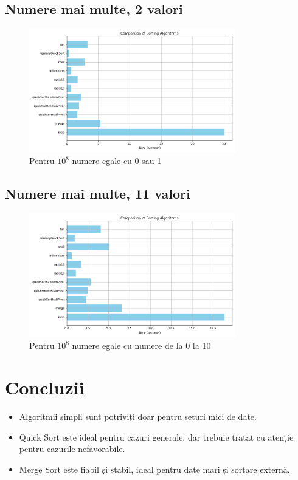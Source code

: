 \documentclass[12pt]{article}
\begin{document}
\subsection{Numere mai multe, 2 valori}
\begin{figure}[H]
    \centering
    \includegraphics[width=0.8\textwidth]{./img/img_20250417_023757.png} %
    \caption{Pentru $10^8$ numere egale cu 0 sau 1}
\end{figure}
\subsection{Numere mai multe, 11 valori}
\begin{figure}[H]
    \centering
    \includegraphics[width=0.8\textwidth]{./img/img_20250417_023946.png} %
    \caption{Pentru $10^8$ numere egale cu numere de la 0 la 10}
\end{figure}

\section{Concluzii}

\begin{itemize}
    \item Algoritmii simpli sunt potriviți doar pentru seturi mici de date.
    \item Quick Sort este ideal pentru cazuri generale, dar trebuie tratat cu atenție pentru cazurile nefavorabile.
    \item Merge Sort este fiabil și stabil, ideal pentru date mari și sortare externă.
\end{itemize}
\end{document}
